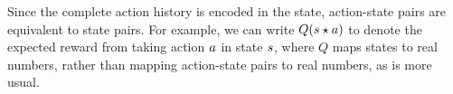 \documentclass[]{article}
\begin{document}
Since the complete action history is encoded in the state, action-state pairs are equivalent to state pairs.
For example, we can write $Q(s \star a)$ to denote the expected reward from taking action $a$ in state $s$, where $Q$ maps states to real numbers, rather than mapping action-state pairs to real numbers, as is more usual.



%
%
%







\end{document}

